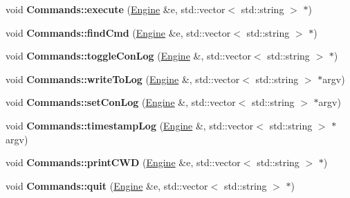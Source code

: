 \begin{DoxyCompactItemize}
\item 
void {\bfseries Commands\+::execute} (\hyperlink{classEngine}{Engine} \&e, std\+::vector$<$ std\+::string $>$ $\ast$)\hypertarget{Commands_8hh_a6cfb223a9b5b99372dd46ac74e45f05e}{}\label{Commands_8hh_a6cfb223a9b5b99372dd46ac74e45f05e}

\item 
void {\bfseries Commands\+::find\+Cmd} (\hyperlink{classEngine}{Engine} \&e, std\+::vector$<$ std\+::string $>$ $\ast$)\hypertarget{Commands_8hh_a5a9b5986047b6c3857a47309939338ea}{}\label{Commands_8hh_a5a9b5986047b6c3857a47309939338ea}

\item 
void {\bfseries Commands\+::toggle\+Con\+Log} (\hyperlink{classEngine}{Engine} \&, std\+::vector$<$ std\+::string $>$ $\ast$)\hypertarget{Commands_8hh_a29033c5de8eb9b3a459cce0af1b682e1}{}\label{Commands_8hh_a29033c5de8eb9b3a459cce0af1b682e1}

\item 
void {\bfseries Commands\+::write\+To\+Log} (\hyperlink{classEngine}{Engine} \&, std\+::vector$<$ std\+::string $>$ $\ast$argv)\hypertarget{Commands_8hh_abc6221d6db875de6393274c79050dc50}{}\label{Commands_8hh_abc6221d6db875de6393274c79050dc50}

\item 
void {\bfseries Commands\+::set\+Con\+Log} (\hyperlink{classEngine}{Engine} \&, std\+::vector$<$ std\+::string $>$ $\ast$argv)\hypertarget{Commands_8hh_a0b95e01fe5e51b1f1b7442169d22d016}{}\label{Commands_8hh_a0b95e01fe5e51b1f1b7442169d22d016}

\item 
void {\bfseries Commands\+::timestamp\+Log} (\hyperlink{classEngine}{Engine} \&, std\+::vector$<$ std\+::string $>$ $\ast$argv)\hypertarget{Commands_8hh_a02b2eb6659d7cf38798162dfae520105}{}\label{Commands_8hh_a02b2eb6659d7cf38798162dfae520105}

\item 
void {\bfseries Commands\+::print\+C\+WD} (\hyperlink{classEngine}{Engine} \&e, std\+::vector$<$ std\+::string $>$ $\ast$)\hypertarget{Commands_8hh_a78e83af80e189d307c49aa8db740b605}{}\label{Commands_8hh_a78e83af80e189d307c49aa8db740b605}

\item 
void {\bfseries Commands\+::quit} (\hyperlink{classEngine}{Engine} \&e, std\+::vector$<$ std\+::string $>$ $\ast$)\hypertarget{Commands_8hh_a25cfa3c76d0c7519d6fa7b3cee3bbd7d}{}\label{Commands_8hh_a25cfa3c76d0c7519d6fa7b3cee3bbd7d}


\end{DoxyCompactItemize}
